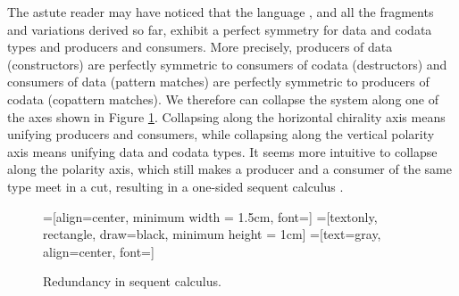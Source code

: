 The astute reader may have noticed that the language \targetlang{}, and all the fragments and variations derived so far, exhibit a perfect symmetry for data and codata types and producers and consumers.
More precisely, producers of data (constructors) are perfectly symmetric to consumers of codata (destructors) and consumers of data (pattern matches) are perfectly symmetric to producers of codata (copattern matches).
We therefore can collapse the system along one of the axes shown in Figure \cref{fig:redundancy}.
Collapsing along the horizontal chirality axis means unifying producers and consumers, while collapsing along the vertical polarity axis means unifying data and codata types.
It seems more intuitive to collapse along the polarity axis, which still makes a producer and a consumer of the same type meet in a cut, resulting in a one-sided sequent calculus \cite{Girard1987}.

\begin{figure}[h!]
=[align=center, minimum width = 1.5cm, font=\small\sffamily]
=[textonly, rectangle, draw=black, minimum height = 1cm]
=[text=gray, align=center, font=\footnotesize\sffamily]


\noindent\caption{Redundancy in sequent calculus.}
\label{fig:redundancy}
\end{figure}

